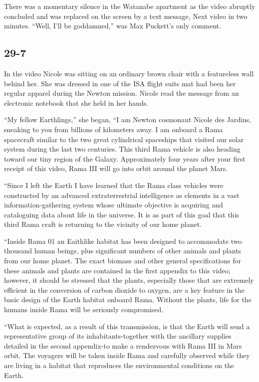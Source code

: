 \documentclass[]{article}
\begin{document}
{There was a momentary silence in the Watanabe apartment as the video abruptly concluded and was replaced on the screen by a text message, Next video in two minutes.  “Well, I’ll be goddamned,” was Max Puckett’s only comment.



\subsection*{29-7}

In the video Nicole was sitting on an ordinary brown chair with a featureless wall behind her.  She was dressed in one of the ISA flight suits mat had been her regular apparel during the Newton mission.  Nicole read the message from an electronic notebook that she held in her hands.

“My fellow Earthlings,” she began, “I am Newton cosmonaut Nicole des Jardins, sneaking to you from billions of kilometers away.  I am onboard a Rama spacecraft similar to the two great cylindrical spaceships that visited our solar system during the last two centuries.  This third Rama vehicle is also heading toward our tiny region of the Galaxy.  Approximately four years after your first receipt of this video, Rama III will go into orbit around the planet Mars.

“Since I left the Earth I have learned that the Rama class vehicles were constructed by an advanced extraterrestrial intelligence as elements in a vast information-gathering system whose ultimate objective is acquiring and cataloguing data about life in the universe.  It is as part of this goal that this third Rama craft is returning to the vicinity of our home planet.

“Inside Rama 01 an Eaithlike habitat has been designed to accommodate two thousand human beings, plus significant numbers of other animals and plants from our home planet.  The exact biomass and other general specifications for these animals and plants are contained in the first appendix to this video; however, it should be stressed that the plants, especially those that are extremely efficient in the conversion of carbon dioxide to oxygen, are a key feature in the basic design of the Earth habitat onboard Rama.  Without the plants, life for the humans inside Rama will be seriously compromised.

“What is expected, as a result of this transmission, is that the Earth will send a representative group of its inhabitants-together with the ancillary supplies detailed in the second appendix-to make a rendezvous with Rama III in Mars orbit.  The voyagers will be taken inside Rama and carefully observed while they are living in a habitat that reproduces the environmental conditions on the Earth.

}
\end{document}
